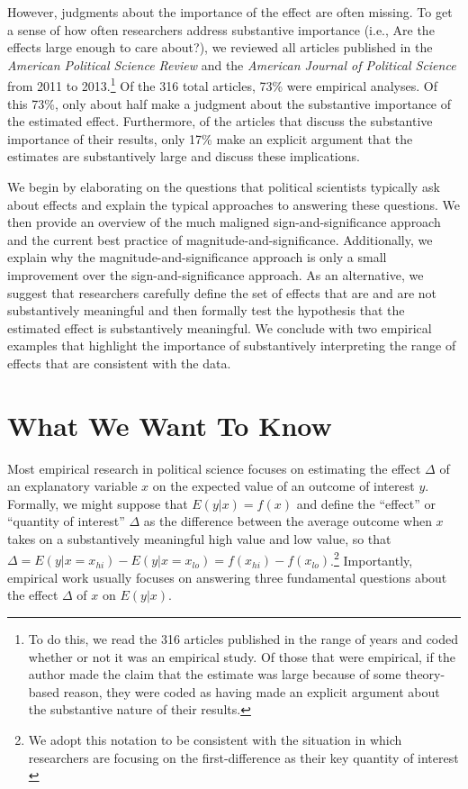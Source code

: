\documentclass[12pt]{article}
\begin{document}
However, judgments about the importance of the effect are often missing. To get a sense of how often researchers address substantive importance (i.e., Are the effects large enough to care about?), we reviewed all articles published in the \textit{American Political Science Review} and the \textit{American Journal of Political Science} from 2011 to 2013.\footnote{\normalbaselineskip To do this, we read the 316 articles published in the range of years and coded whether or not it was an empirical study. Of those that were empirical, if the author made the claim that the estimate was large because of some theory-based reason, they were coded as having made an explicit argument about the substantive nature of their results.}  Of the 316 total articles, 73\% were empirical analyses. Of this 73\%, only about half make a judgment about the substantive importance of the estimated effect. Furthermore, of the articles that discuss the substantive importance of their results, only 17\% make an explicit argument that the estimates are substantively large and discuss these implications.

We begin by elaborating on the questions that political scientists typically ask about effects and explain the typical approaches to answering these questions. We then provide an overview of the much maligned sign-and-significance approach and the current best practice of magnitude-and-significance. Additionally, we explain why the magnitude-and-significance approach is only a small improvement over the sign-and-significance approach. As an alternative, we suggest that researchers carefully define the set of effects that are and are not substantively meaningful and then formally test the hypothesis that the estimated effect is substantively meaningful. We conclude with two empirical examples that highlight the importance of substantively interpreting the range of effects that are consistent with the data.

\section*{What We Want To Know}

Most empirical research in political science focuses on estimating the effect $\Delta$ of an explanatory variable $x$ on the expected value of an outcome of interest $y$. Formally, we might suppose that $E(y | x) = f(x)$ and define the ``effect'' or ``quantity of interest'' $\Delta$ as the difference between the average outcome when $x$ takes on a substantively meaningful high value and low value, so that $\Delta = E(y | x = x_{hi}) - E(y | x = x_{lo}) = f(x_{hi}) - f(x_{lo})$.\footnote{We adopt this notation to be consistent with the situation in which researchers are focusing on the first-difference as their key quantity of interest \citep{KingTomzWittenberg2000}} Importantly, empirical work usually focuses on answering three fundamental questions about the effect $\Delta$ of $x$ on $E(y|x)$.
\end{document}
